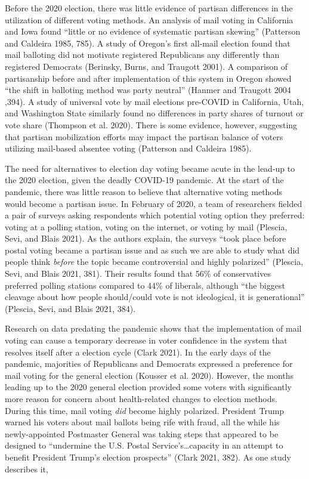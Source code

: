 \documentclass[12pt]{article}
\begin{document}
Before the 2020 election, there was little evidence of partisan differences in the utilization of different voting methods. An analysis of mail voting in California and Iowa found ``little or no evidence of systematic partisan skewing'' (Patterson and Caldeira 1985, 785). A study of Oregon's first all-mail election found that mail balloting did not motivate registered Republicans any differently than registered Democrats (Berinsky, Burns, and Traugott 2001). A comparison of partisanship before and after implementation of this system in Oregon showed ``the shift in balloting method was party neutral'' (Hanmer and Traugott 2004 ,394). A study of universal vote by mail elections pre-COVID in California, Utah, and Washington State similarly found no differences in party shares of turnout or vote share (Thompson et al. 2020). There is some evidence, however, suggesting that partisan mobilization efforts may impact the partisan balance of voters utilizing mail-based absentee voting (Patterson and Caldeira 1985).

The need for alternatives to election day voting became acute in the lead-up to the 2020 election, given the deadly COVID-19 pandemic. At the start of the pandemic, there was little reason to believe that alternative voting methods would become a partisan issue. In February of 2020, a team of researchers fielded a pair of surveys asking respondents which potential voting option they preferred: voting at a polling station, voting on the internet, or voting by mail (Plescia, Sevi, and Blais 2021). As the authors explain, the surveys ``took place before postal voting became a partisan issue and as such we are able to study what did people think \emph{before} the topic became controversial and highly polarized'' (Plescia, Sevi, and Blais 2021, 381). Their results found that 56\% of conservatives preferred polling stations compared to 44\% of liberals, although ``the biggest cleavage about how people should/could vote is not ideological, it is generational'' (Plescia, Sevi, and Blais 2021, 384).

Research on data predating the pandemic shows that the implementation of mail voting can cause a temporary decrease in voter confidence in the system that resolves itself after a election cycle (Clark 2021). In the early days of the pandemic, majorities of Republicans and Democrats expressed a preference for mail voting for the general election (Kousser et al. 2020). However, the months leading up to the 2020 general election provided some voters with significantly more reason for concern about health-related changes to election methods. During this time, mail voting \emph{did} become highly polarized. President Trump warned his voters about mail ballots being rife with fraud, all the while his newly-appointed Postmaster General was taking steps that appeared to be designed to ``undermine the U.S. Postal Service's\ldots capacity in an attempt to benefit President Trump's election prospects'' (Clark 2021, 382). As one study describes it,
\end{document}
